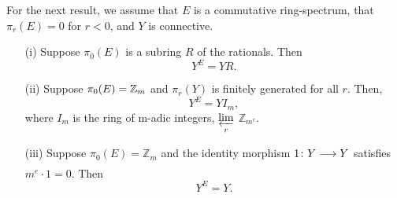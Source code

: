 \documentclass[../main]{subfiles}
\begin{document}
For the next result, we assume that $E$ is a commutative ring-spectrum, that  $ \pi_{r}(E)=0$ for $r<0$, and  $Y$ is connective.\\

 \begin{theorem} \label{thm:p3ch14.6}
\begin{enumerate} 
  \item [(i)] Suppose $ \pi_{0}(E)$ is a subring $R$ of the rationals. Then  \[
    Y^E = YR.
  \] 
\item [(ii)] Suppose $ \pi_{0}(E)=\mathbb{Z}_{m}$ and  $\pi_{r}(Y)$ is finitely generated for all $r$. Then, 
  \[
    Y^E = YI_{m},
  \] 
  where $I_{m}$ is the ring of m-adic integers, $\displaystyle{\varprojlim_r}$ $\mathbb{Z}_{m^r}$. 
\item [(iii)] Suppose $ \pi_{0}(E)=\mathbb{Z}_{m}$ and the identity morphism $1\colon Y \lar{} Y$ satisfies $m^e\cdot 1=0$. Then 
  \[
    Y^E = Y.
  \] 
\end{enumerate}
\end{theorem}
   
\end{document}
